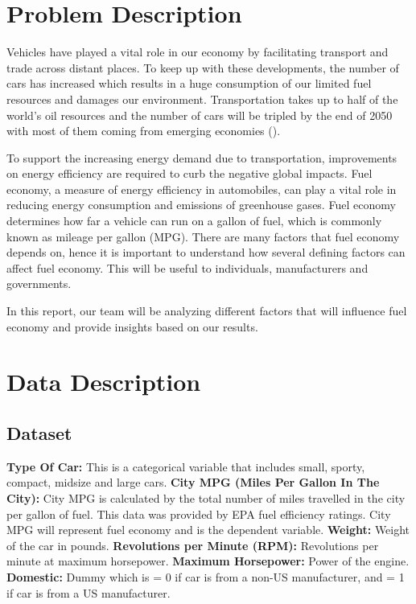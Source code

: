 \documentclass[12pt]{article}
\begin{document}
\section{Problem Description}
Vehicles have played a vital role in our economy by facilitating transport and trade across distant places. To keep up with these developments, the number of cars has increased which results in a huge consumption of our limited fuel resources and damages our environment. Transportation takes up to half of the world’s oil resources and the number of cars will be tripled by the end of 2050 with most of them coming from emerging economies (\cite{FIA}). 

To support the increasing energy demand due to transportation, improvements on energy efficiency are required to curb the negative global impacts. Fuel economy, a measure of energy efficiency in automobiles, can play a vital role in reducing energy consumption and emissions of greenhouse gases. Fuel economy determines how far a vehicle can run on a gallon of fuel, which is commonly known as mileage per gallon (MPG). There are many factors that fuel economy depends on, hence it is important to understand how several defining factors can affect fuel economy. This will be useful to individuals, manufacturers and governments.  

In this report, our team will be analyzing different factors that will influence fuel economy and provide insights based on our results. 


\section{Data Description}
\subsection{Dataset}
 

\textbf{Type Of Car:} This is a categorical variable that includes small, sporty, compact, midsize and large cars. \newline
 \textbf{City MPG (Miles Per Gallon In The City):} City MPG is calculated by the total number of miles travelled in the city per gallon of fuel. This data was provided by EPA fuel efficiency ratings. City MPG will represent fuel economy and is the dependent variable.\newline
\textbf{Weight:} Weight of the car in pounds.\newline
\textbf{Revolutions per Minute (RPM):} Revolutions per minute at maximum horsepower.\newline
\textbf{Maximum Horsepower:} Power of the engine. \newline  
\textbf{Domestic:} Dummy which is = 0 if car is from a non-US manufacturer, and = 1 if car is from a US manufacturer.          
\end{document}
